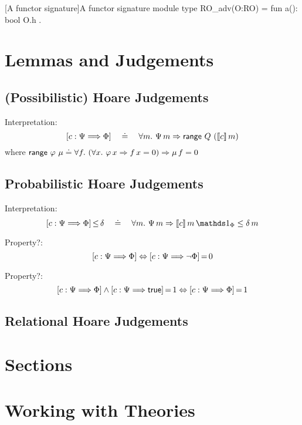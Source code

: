 \begin{easycrypt}[label={lst:functorsig}]{[A functor signature]A functor signature}
module type RO_adv(O:RO) = {
  fun a(): bool { O.h }
}.
\end{easycrypt}

\section{Lemmas and Judgements}


\subsection{(Possibilistic) Hoare Judgements}

Interpretation:
\begin{displaymath}
\left[{c}:{\Psi}\Longrightarrow{\Phi}\right]
\quad\doteq\quad
\forall m.~ \Psi\,m \Rightarrow \mathsf{range}~{Q}~{(}[\![ c ]\!]\,m)
\end{displaymath}
%
where $\mathsf{range}~{\varphi}~{\mu} \doteq \forall f.~ (\forall x.~ \varphi\,x
\Rightarrow f\,x=0) \Rightarrow \mu\,f=0$




\subsection{Probabilistic Hoare Judgements}

Interpretation:
\begin{displaymath}
\HoareLe{c}{\pre}{\post}{\delta} 
\quad\doteq\quad
\forall m.~ \pre\,m \Rightarrow [\![ c ]\!]\,m\,\charfun_\post \leq
\delta\,m
\end{displaymath}

Property?:
\begin{displaymath}
\left[{c}:{\Psi}\Longrightarrow{\Phi}\right]
\Leftrightarrow
{\left[{c}:{\Psi}\Longrightarrow{\neg\Phi}\right]}\,{=}\,{0}
\end{displaymath}

Property?:
\begin{displaymath}
\left[{c}:{\Psi}\Longrightarrow{\Phi}\right] \land {\left[{c}:{\Psi}\Longrightarrow{\mathsf{true}}\right]}\,{=}\,{1}
\Leftrightarrow
{\left[{c}:{\Psi}\Longrightarrow{\Phi}\right]}\,{=}\,{1}
\end{displaymath}

\subsection{Relational Hoare Judgements}

\section{Sections}

\section{Working with Theories\label{sec:cloning}}





